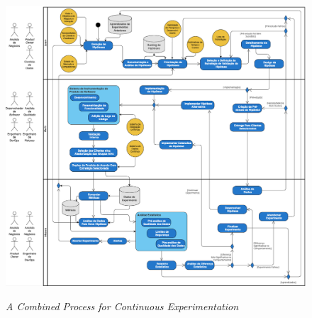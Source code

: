 \begin{figure}
\centering
\caption{\textit{A Combined Process for Continuous Experimentation}}
\includegraphics[width=1\linewidth]{figuras/combined_ce_process.png}
\label{fig:erthal-process}
\end{figure}


